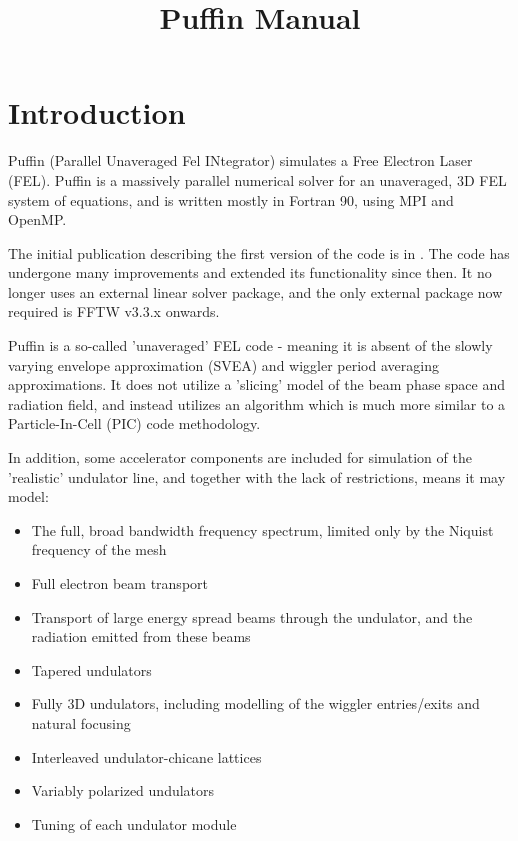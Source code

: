 \documentclass[12pt]{article}%
\begin{document}
\title{Puffin Manual}

\maketitle

\newpage

\tableofcontents

\newpage

\section{Introduction}

Puffin (Parallel Unaveraged Fel INtegrator) simulates a Free Electron Laser (FEL). Puffin is a massively parallel numerical solver for an unaveraged, 3D FEL system of equations, and is written mostly in Fortran 90, using MPI and OpenMP.

The initial publication describing the first version of the code is in \cite{puffin}. The code has undergone many improvements and extended its functionality since then. It no longer uses an external linear solver package, and the only external package now required is FFTW v3.3.x onwards.

Puffin is a so-called 'unaveraged' FEL code - meaning it is absent of the slowly varying envelope approximation (SVEA) and wiggler period averaging approximations. It does not utilize a 'slicing' model of the beam phase space and radiation field, and instead utilizes an algorithm which is much more similar to a Particle-In-Cell (PIC) code methodology.

In addition, some accelerator components are included for simulation of the 'realistic' undulator line, and together with the lack of restrictions, means it may model:

\begin{itemize}
\item The full, broad bandwidth frequency spectrum, limited only by the Niquist frequency of the mesh
\item Full electron beam transport
\item Transport of large energy spread beams through the undulator, and the radiation emitted from these beams
\item Tapered undulators
\item Fully 3D undulators, including modelling of the wiggler entries/exits and natural focusing
\item Interleaved undulator-chicane lattices
\item Variably polarized undulators
\item Tuning of each undulator module
\end{itemize}
\end{document}
